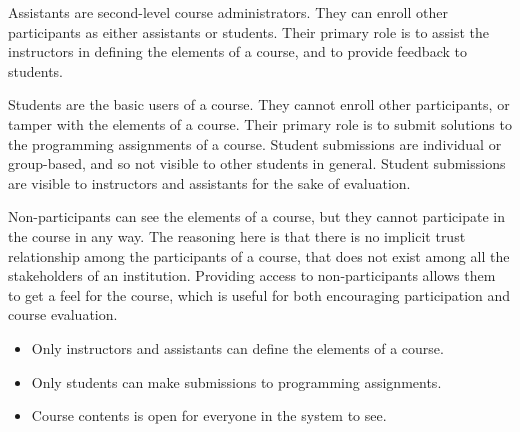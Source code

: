 Assistants are second-level course administrators. They can enroll other
participants as either assistants or students. Their primary role is to assist
the instructors in defining the elements of a course, and to provide feedback
to students.

Students are the basic users of a course. They cannot enroll other
participants, or tamper with the elements of a course. Their primary role is to
submit solutions to the programming assignments of a course. Student
submissions are individual or group-based, and so not visible to other students
in general. Student submissions are visible to instructors and assistants for
the sake of evaluation.

Non-participants can see the elements of a course, but they cannot participate
in the course in any way. The reasoning here is that there is no implicit trust
relationship among the participants of a course, that does not exist among all
the stakeholders of an institution. Providing access to non-participants allows
them to get a feel for the course, which is useful for both encouraging
participation and course evaluation.

\begin{itemize}

\item Only instructors and assistants can define the elements of a course.

\item Only students can make submissions to programming assignments.

\item Course contents is open for everyone in the system to see.

\end{itemize}





